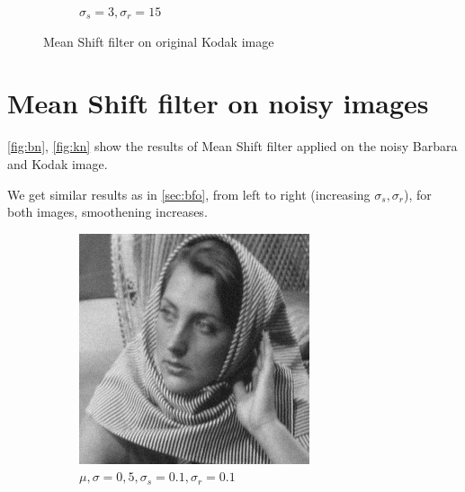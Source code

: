 \documentclass[a4paper, landscape]{article}
\begin{document}
\begin{figure}
\begin{subfigure}{0.33\linewidth}
        \caption{$\sigma_s=3, \sigma_r=15$}
    \end{subfigure}
    \caption{Mean Shift filter on original Kodak image}
    \label{fig:ks}
\end{figure}
\section{Mean Shift filter on noisy images}
\ref{fig:bn}, \ref{fig:kn} show the results of Mean Shift filter applied on the noisy Barbara and Kodak image.

We get similar results as in \ref{sec:bfo}, from left to right (increasing $\sigma_s, \sigma_r$), for both images, smoothening increases.
\begin{figure}
    \centering
    \begin{subfigure}{0.33\linewidth}
        \centering
        \includegraphics[width=\linewidth]{barbara256,σ_noise5,σ_spatial0.1,σ_range0.1.png}
        \caption{$\mu, \sigma = 0, 5, \sigma_s=0.1, \sigma_r=0.1$}
    \end{subfigure}
    \begin{subfigure}{0.33\linewidth}
        \centering

\end{subfigure}
\end{figure}
\end{document}
